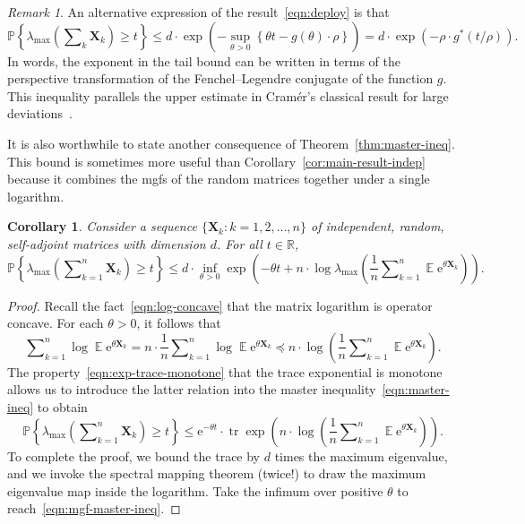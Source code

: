 \documentclass[11pt,letterpaper,twoside,reqno,draft]{amsart}
\newtheorem{cor}[thm]{Corollary}
\theoremstyle{remark}
\newtheorem{rem}[thm]{Remark}
\numberwithin{equation}{section}
\numberwithin{thm}{section}
\begin{document}
\begin{rem}
An alternative expression of the result~\eqref{eqn:deploy} is that
\begin{equation*} 
{\mathbb{P}\left\{ {{ \lambda_{\max}\left(\sum\nolimits_k {\bm{{X}}}_k \right) \geq t }} \right\}}
	\leq d \cdot \exp\left( - \sup_{\theta > 0} \left\{ \theta t - g(\theta) \cdot \rho \right\} \right)
	= d \cdot \exp\left( - \rho \cdot g^*(t/\rho) \right).
\end{equation*}
In words, the exponent in the tail bound can be written in terms of the perspective transformation of the Fenchel--Legendre conjugate of the function $g$. 
This inequality parallels the upper estimate in Cram{\'e}r's classical result for large deviations~\cite[Thm.~2.2.3]{DZ98:Large-Deviations}.  
\end{rem}

It is also worthwhile to state another consequence of Theorem~\ref{thm:master-ineq}.  This bound is sometimes more useful than Corollary~\ref{cor:main-result-indep} because it combines the mgfs of the random matrices together under a single logarithm.

\begin{cor} \label{cor:mgf-master-ineq} 
Consider a sequence $\{ {\bm{{X}}}_k : k = 1, 2, \dots, n \}$ of independent, random, self-adjoint matrices with dimension $d$.  For all $t \in \mathbb{R}$,
\begin{equation} \label{eqn:mgf-master-ineq}
{\mathbb{P}\left\{ {{ \lambda_{\max}\left( \sum\nolimits_{k=1}^n {\bm{{X}}}_k \right) \geq t }} \right\}}
	\leq d \cdot \inf_{\theta > 0} \exp\left( - \theta t +
	n \cdot \log \lambda_{\max}\left(
	\frac{1}{n} \sum\nolimits_{k=1}^n {\operatorname{\mathbb{E}}} {\mathrm{e}}^{\theta {\bm{{X}}}_k} \right)
	\right).
\end{equation}
\end{cor}

\begin{proof}
Recall the fact~\eqref{eqn:log-concave} that the matrix logarithm is operator concave.  For each $\theta > 0$, it follows that
$$
\sum\nolimits_{k=1}^n \log {\operatorname{\mathbb{E}}} {\mathrm{e}}^{\theta {\bm{{X}}}_k}
	= n \cdot \frac{1}{n} \sum\nolimits_{k=1}^n \log {\operatorname{\mathbb{E}}} {\mathrm{e}}^{\theta {\bm{{X}}}_k}
	{\preccurlyeq} n \cdot \log \left( \frac{1}{n} \sum\nolimits_{k=1}^n {\operatorname{\mathbb{E}}} {\mathrm{e}}^{\theta {\bm{{X}}}_k} \right).
$$
The property~\eqref{eqn:exp-trace-monotone} that the trace exponential is monotone allows us to introduce the latter relation into the master inequality~\eqref{eqn:master-ineq} to obtain
$$
{\mathbb{P}\left\{ {{ \lambda_{\max}\left( \sum\nolimits_{k=1}^n {\bm{{X}}}_k \right) \geq t }} \right\}}
	\leq {\mathrm{e}}^{-\theta t}
	\cdot {\operatorname{tr}} \exp \left( n \cdot \log \left( \frac{1}{n} \sum\nolimits_{k=1}^n
	 {\operatorname{\mathbb{E}}} {\mathrm{e}}^{\theta {\bm{{X}}}_k} \right) \right).
$$
To complete the proof, we bound the trace by $d$ times the maximum eigenvalue, and we invoke the spectral mapping theorem (twice!) to draw the maximum eigenvalue map inside the logarithm.  Take the infimum over positive $\theta$ to reach~\eqref{eqn:mgf-master-ineq}.
\end{proof}
\end{document}
